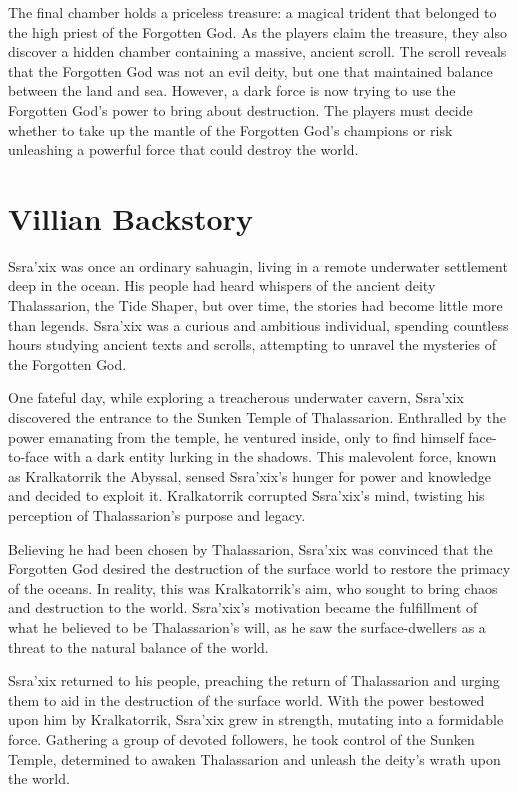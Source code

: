\documentclass[letterpaper,twocolumn,openany]{dndarticle}
\begin{document}
The final chamber holds a priceless treasure: a magical trident that belonged to the high priest of the Forgotten God. As the players claim the treasure, they also discover a hidden chamber containing a massive, ancient scroll. The scroll reveals that the Forgotten God was not an evil deity, but one that maintained balance between the land and sea. However, a dark force is now trying to use the Forgotten God's power to bring about destruction. The players must decide whether to take up the mantle of the Forgotten God's champions or risk unleashing a powerful force that could destroy the world.



\section{Villian Backstory}
Ssra'xix was once an ordinary sahuagin, living in a remote underwater settlement deep in the ocean. His people had heard whispers of the ancient deity Thalassarion, the Tide Shaper, but over time, the stories had become little more than legends. Ssra'xix was a curious and ambitious individual, spending countless hours studying ancient texts and scrolls, attempting to unravel the mysteries of the Forgotten God.

One fateful day, while exploring a treacherous underwater cavern, Ssra'xix discovered the entrance to the Sunken Temple of Thalassarion. Enthralled by the power emanating from the temple, he ventured inside, only to find himself face-to-face with a dark entity lurking in the shadows. This malevolent force, known as Kralkatorrik the Abyssal, sensed Ssra'xix's hunger for power and knowledge and decided to exploit it. Kralkatorrik corrupted Ssra'xix's mind, twisting his perception of Thalassarion's purpose and legacy.

Believing he had been chosen by Thalassarion, Ssra'xix was convinced that the Forgotten God desired the destruction of the surface world to restore the primacy of the oceans. In reality, this was Kralkatorrik's aim, who sought to bring chaos and destruction to the world. Ssra'xix's motivation became the fulfillment of what he believed to be Thalassarion's will, as he saw the surface-dwellers as a threat to the natural balance of the world.

Ssra'xix returned to his people, preaching the return of Thalassarion and urging them to aid in the destruction of the surface world. With the power bestowed upon him by Kralkatorrik, Ssra'xix grew in strength, mutating into a formidable force. Gathering a group of devoted followers, he took control of the Sunken Temple, determined to awaken Thalassarion and unleash the deity's wrath upon the world.
\end{document}
